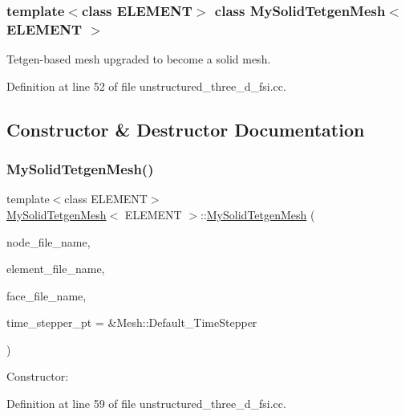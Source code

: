 \subsubsection*{template$<$class E\+L\+E\+M\+E\+NT$>$\newline
class My\+Solid\+Tetgen\+Mesh$<$ E\+L\+E\+M\+E\+N\+T $>$}

Tetgen-\/based mesh upgraded to become a solid mesh. 

Definition at line 52 of file unstructured\+\_\+three\+\_\+d\+\_\+fsi.\+cc.



\subsection{Constructor \& Destructor Documentation}
\mbox{\label{classMySolidTetgenMesh_ac6f8d5bf403bb9da0149184c30eb6d8d}} 
\subsubsection{\texorpdfstring{My\+Solid\+Tetgen\+Mesh()}{MySolidTetgenMesh()}}
{\footnotesize\ttfamily template$<$class E\+L\+E\+M\+E\+NT$>$ \\
\hyperlink{classMySolidTetgenMesh}{My\+Solid\+Tetgen\+Mesh}$<$ E\+L\+E\+M\+E\+NT $>$\+::\hyperlink{classMySolidTetgenMesh}{My\+Solid\+Tetgen\+Mesh} (\begin{DoxyParamCaption}\item[{const std\+::string \&}]{node\+\_\+file\+\_\+name,  }\item[{const std\+::string \&}]{element\+\_\+file\+\_\+name,  }\item[{const std\+::string \&}]{face\+\_\+file\+\_\+name,  }\item[{Time\+Stepper $\ast$}]{time\+\_\+stepper\+\_\+pt = {\ttfamily \&Mesh\+:\+:Default\+\_\+TimeStepper} }\end{DoxyParamCaption})\hspace{0.3cm}{\ttfamily [inline]}}



Constructor\+: 



Definition at line 59 of file unstructured\+\_\+three\+\_\+d\+\_\+fsi.\+cc.

